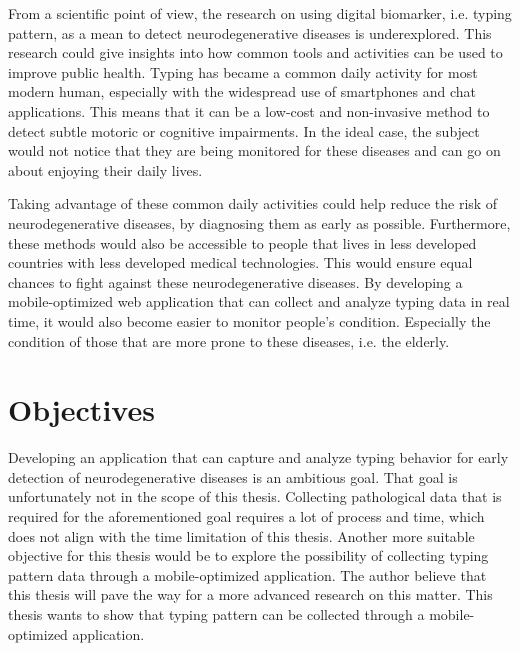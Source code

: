 From a scientific point of view, the research on using digital biomarker, i.e. typing pattern, as a mean to detect neurodegenerative diseases is underexplored.
This research could give insights into how common tools and activities can be used to improve public health.
Typing has became a common daily activity for most modern human, especially with the widespread use of smartphones and chat applications.
This means that it can be a low-cost and non-invasive method to detect subtle motoric or cognitive impairments.
In the ideal case, the subject would not notice that they are being monitored for these diseases and can go on about enjoying their daily lives.

Taking advantage of these common daily activities could help reduce the risk of neurodegenerative diseases, by diagnosing them as early as possible.
Furthermore, these methods would also be accessible to people that lives in less developed countries with less developed medical technologies.
This would ensure equal chances to fight against these neurodegenerative diseases.
By developing a mobile-optimized web application that can collect and analyze typing data in real time, it would also become easier to monitor people's condition.
Especially the condition of those that are more prone to these diseases, i.e. the elderly.

\section{Objectives}


Developing an application that can capture and analyze typing behavior for early detection of neurodegenerative diseases is an ambitious goal.
That goal is unfortunately not in the scope of this thesis.
Collecting pathological data that is required for the aforementioned goal requires a lot of process and time, which does not align with the time limitation of this thesis.
Another more suitable objective for this thesis would be to explore the possibility of collecting typing pattern data through a mobile-optimized application.
The author believe that this thesis will pave the way for a more advanced research on this matter.
This thesis wants to show that typing pattern can be collected through a mobile-optimized application.

